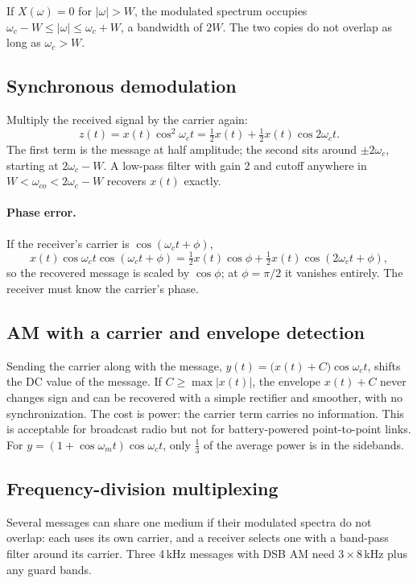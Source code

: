 \documentclass[11pt]{article}
\numberwithin{equation}{section}
\theoremstyle{definition}
\theoremstyle{remark}
\begin{document}
If $X(\omega)=0$ for $|\omega|>W$, the modulated spectrum occupies $\omega_c-W\le|\omega|\le\omega_c+W$,
a bandwidth of $2W$. The two copies do not overlap as long as $\omega_c>W$.

\subsection{Synchronous demodulation}
Multiply the received signal by the carrier again:
\begin{equation}
z(t)=x(t)\cos^2\omega_ct=\tfrac12x(t)+\tfrac12x(t)\cos2\omega_ct.
\end{equation}
The first term is the message at half amplitude; the second sits around $\pm2\omega_c$, starting at
$2\omega_c-W$. A low-pass filter with gain 2 and cutoff anywhere in $W<\omega_{co}<2\omega_c-W$
recovers $x(t)$ exactly.

\paragraph{Phase error.} If the receiver's carrier is $\cos(\omega_ct+\phi)$,
\begin{equation}
x(t)\cos\omega_ct\cos(\omega_ct+\phi)=\tfrac12x(t)\cos\phi+\tfrac12x(t)\cos(2\omega_ct+\phi),
\end{equation}
so the recovered message is scaled by $\cos\phi$; at $\phi=\pi/2$ it vanishes entirely. The receiver
must know the carrier's phase.

\subsection{AM with a carrier and envelope detection}
Sending the carrier along with the message, $y(t)=\big(x(t)+C\big)\cos\omega_ct$, shifts the DC value of
the message. If $C\ge\max|x(t)|$, the envelope $x(t)+C$ never changes sign and can be recovered with
a simple rectifier and smoother, with no synchronization. The cost is power: the carrier term carries
no information. This is acceptable for broadcast radio but not for battery-powered point-to-point
links. For $y=(1+\cos\omega_mt)\cos\omega_ct$, only $\frac13$ of the average power is in the sidebands.

\subsection{Frequency-division multiplexing}
Several messages can share one medium if their modulated spectra do not overlap: each uses its own
carrier, and a receiver selects one with a band-pass filter around its carrier. Three 4\,kHz
messages with DSB AM need $3\times8$\,kHz plus any guard bands.
\end{document}
